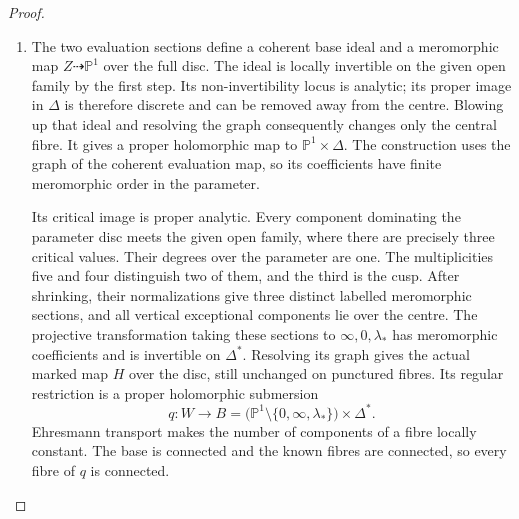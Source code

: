 \begin{proof}
\begin{enumerate}[label=\arabic*.]
Put $\mathcal J=\omega_{Z/\Delta}^{-4}$.
The sheaves $R^jp_*\mathcal J$ are coherent
\cite[\S6, Hauptsatz I, p.~59]{Grauert60}.
Multiplication by a nonzero parameter germ is injective on
$\mathcal J$ and on $p_*\mathcal J$, so $p_*\mathcal J$ is locally free
over the disc and free after shrinking.
The actual exact sequence for a fibre over $t$ gives
\[
 0\longrightarrow(p_*\mathcal J)_t/\mathfrak m_t(p_*\mathcal J)_t
 \longrightarrow H^0(Z_t,\mathcal J_t)
 \longrightarrow
 \ker\bigl((t'-t): (R^1p_*\mathcal J)_t
                       \longrightarrow(R^1p_*\mathcal J)_t\bigr)
 \longrightarrow0.
\]
The last term is supported in the torsion support of the
coherent sheaf $R^1p_*\mathcal J$, a closed discrete analytic
set.  At a point of the given open family outside this support,
the displayed comparison shows that $p_*\mathcal J$ has rank
two.  Shrinking makes the support empty away from the centre.
Thus a frame of $p_*\mathcal J$ gives the complete two-dimensional
linear system on each punctured fibre.  This uses the displayed
coherent maps, without assuming closedness of a general
base-change failure set.

\item The two evaluation sections define a coherent base ideal and
a meromorphic map $Z\dashrightarrow\mathbb P^1$ over the full
disc.  The ideal is locally invertible on the given open family
by the first step.  Its non-invertibility locus is analytic;
its proper image in $\Delta$ is therefore discrete and can be
removed away from the centre.  Blowing up that ideal and
resolving the graph consequently changes only the central
fibre.  It gives a proper holomorphic map to
$\mathbb P^1\times\Delta$.  The construction uses the graph
of the coherent evaluation map, so its coefficients have
finite meromorphic order in the parameter.

Its critical image is proper analytic.  Every component
dominating the parameter disc meets the given open family,
where there are precisely three critical values.  Their
degrees over the parameter are one.  The multiplicities five
and four distinguish two of them, and the third is the cusp.
After shrinking, their normalizations give three distinct
labelled meromorphic sections, and all vertical exceptional
components lie over the centre.  The projective transformation
taking these sections to $\infty,0,\lambda_*$ has meromorphic
coefficients and is invertible on $\Delta^*$.  Resolving its
graph gives the actual marked map $H$ over the disc, still
unchanged on punctured fibres.  Its regular restriction is a
proper holomorphic submersion
\[
 q:W\longrightarrow
 B=\bigl(\mathbb P^1\setminus\{0,\infty,\lambda_*\}\bigr)
          \times\Delta^*.
\]
Ehresmann transport makes the number of components of a fibre
locally constant.  The base is connected and the known fibres
are connected, so every fibre of $q$ is connected.


\end{enumerate}
\end{proof}
